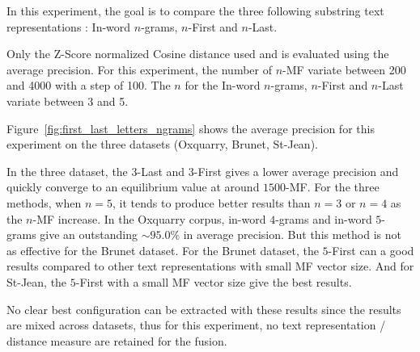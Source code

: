 In this experiment, the goal is to compare the three following substring text representations : In-word $n$-grams, $n$-First and $n$-Last.

Only the Z-Score normalized Cosine distance used and is evaluated using the average precision.
For this experiment, the number of $n$-MF variate between 200 and 4000 with a step of 100.
The $n$ for the In-word $n$-grams, $n$-First and $n$-Last variate between 3 and 5.

Figure~\ref{fig:first_last_letters_ngrams} shows the average precision for this experiment on the three datasets (Oxquarry, Brunet, St-Jean).

In the three dataset, the $3$-Last and $3$-First gives a lower average precision and quickly converge to an equilibrium value at around $1500$-MF.
For the three methods, when $n = 5$, it tends to produce better results than $n = 3$ or $n = 4$ as the $n$-MF increase.
In the Oxquarry corpus, in-word $4$-grams and in-word $5$-grams give an outstanding $\sim 95.0\%$ in average precision.
But this method is not as effective for the Brunet dataset.
For the Brunet dataset, the $5$-First can a good results compared to other text representations with small MF vector size.
And for St-Jean, the $5$-First with a small MF vector size give the best results.

No clear best configuration can be extracted with these results since the results are mixed across datasets, thus for this experiment, no text representation / distance measure are retained for the fusion.

